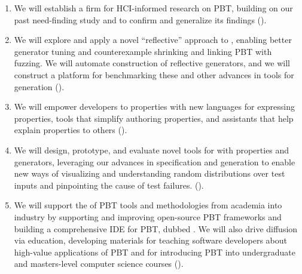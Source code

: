 \begin{enumerate}[noitemsep]
\item We will establish a firm  for HCI-informed research on PBT,
building on our past need-finding study and to confirm and generalize
its findings ().
%
\item We will explore and apply a novel ``reflective'' approach to
, enabling better generator tuning and counterexample
shrinking and linking PBT with fuzzing.  We will automate construction
of reflective generators, and we will construct a platform for
benchmarking these and other advances in tools for generation ().

%
\item We will empower developers to  properties with new
languages for expressing properties, tools that simplify authoring
properties, and assistants that help explain properties to others
().
%
\item We will design, prototype, and evaluate novel tools for
 with properties
and generators, leveraging our advances in specification and generation to
enable new ways of visualizing and understanding random distributions
over test inputs and pinpointing the cause of test failures.
().
%
\item We will support the  of PBT tools and
methodologies from academia into industry by supporting and
improving open-source PBT frameworks\iflater{}\fi{} and building a
comprehensive IDE for PBT, dubbed \tyche.
We will also drive diffusion via education, developing materials for teaching
software developers about high-value applications of PBT and
for introducing PBT into undergraduate and masters-level computer science courses
().
\end{enumerate}
